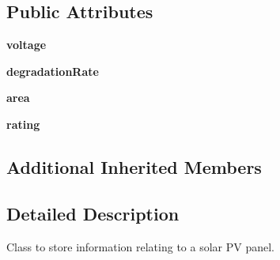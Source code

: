 \subsection*{Public Attributes}
\begin{DoxyCompactItemize}
\item 
\hypertarget{class_solar_calculator_1_1_assets_1_1_p_v_panel_a9949326d065c202472ce3cafc02da853}{{\bfseries voltage}}\label{class_solar_calculator_1_1_assets_1_1_p_v_panel_a9949326d065c202472ce3cafc02da853}

\item 
\hypertarget{class_solar_calculator_1_1_assets_1_1_p_v_panel_a9e5c79ba8117cd0145a16c02113c485d}{{\bfseries degradation\-Rate}}\label{class_solar_calculator_1_1_assets_1_1_p_v_panel_a9e5c79ba8117cd0145a16c02113c485d}

\item 
\hypertarget{class_solar_calculator_1_1_assets_1_1_p_v_panel_a6f9caed47034d7e47ed9f86966087830}{{\bfseries area}}\label{class_solar_calculator_1_1_assets_1_1_p_v_panel_a6f9caed47034d7e47ed9f86966087830}

\item 
\hypertarget{class_solar_calculator_1_1_assets_1_1_p_v_panel_ad75c609bc7549e0e742f8a1142f7bdcf}{{\bfseries rating}}\label{class_solar_calculator_1_1_assets_1_1_p_v_panel_ad75c609bc7549e0e742f8a1142f7bdcf}

\end{DoxyCompactItemize}
\subsection*{Additional Inherited Members}


\subsection{Detailed Description}
\begin{DoxyVerb}Class to store information relating to a solar PV panel. \end{DoxyVerb}
 

